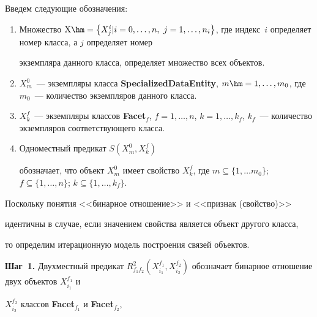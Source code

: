   Введем следующие обозначения:


  \begin{enumerate}


  \item Множество $\mathrm{X}\hm =\left\{X_j^i\vert  i =0, \ldots , n,\ j =1, \ldots ,


n_i \right\}$, где индекс~$i$ определяет номер класса, а $j$ определяет номер


экземпляра данного класса, определяет множество всех объектов.\\[-15pt]


  \item $X_m^0$~--- экземпляры класса \textbf{SpecializedDataEntity}, $m \hm= 1,


\ldots, m_0$, где $m_0$~---  количество экземпляров данного класса.\\[-15pt]


  \item $X_k^f$~--- экземпляры классов \textbf{Facet}$_f$, $f=1, \ldots , n$, $k =


1, \ldots , k_f$, $k_f$~--- количество экземпляров соответствующего класса.\\[-15pt]


  \item Одноместный предикат ${S}\left(X_m^0, X_k^f\right)$


обозначает, что объект $X_m^0$ имеет свойство $X_k^f$, где $m \subseteq\{1,


\ldots  m_0\}$; $f \subseteq\{ 1, \ldots , n\}$; $k \subseteq \{1, \ldots , k_f\}$.


  \end{enumerate}





  Поскольку понятия <<бинарное отношение>> и <<признак (свойство)>>


идентичны в случае, если значением свойства является объект другого класса,


то определим итерационную модель построения связей объектов.





  \smallskip


\textbf{Шаг~1.} Двухместный предикат ${R}^2_{f_1 f_2} (X^{f_1}_{i_1},


X^{f_2}_{i_2})$ обозначает бинарное отношение двух объектов $X_{i_1}^{f_1}$ и


$X_{i_2}^{f_2}$ классов \textbf{Facet}$_{f_1}$ и \textbf{Facet}$_{f_2}$,


